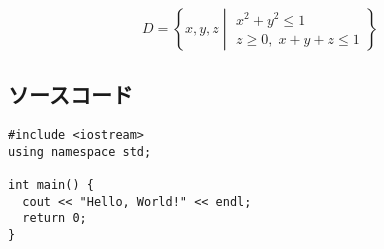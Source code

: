 \documentclass[main]{subfiles}
\begin{document}
\begin{equation}
  D=\left\{
  x,y,z\;\left|\;
  \begin{gathered}
    x^2+y^2\le 1\\
    z\ge 0,\;x+y+z\le 1
  \end{gathered}
  \right.
  \right\}
\end{equation}

\subsection{ソースコード}

\begin{verbatim}
#include <iostream>
using namespace std;

int main() {
  cout << "Hello, World!" << endl;
  return 0;
}
\end{verbatim}
\end{document}
